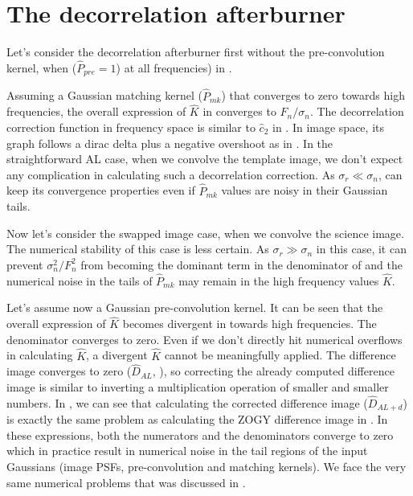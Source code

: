 \section{The decorrelation afterburner\label{sec:decorrab}}
Let's consider the decorrelation afterburner first without the
pre-convolution kernel, when (\(\hat{P}_{pre}=1\)) at all frequencies)
in .
%
\par Assuming a Gaussian matching kernel (\(\hat{P}_{mk}\)) that
converges to zero towards high frequencies, the overall expression of
\(\hat{K}\) in  converges to \(F_{n}/\sigma_n\). The
decorrelation correction function in frequency space is similar to
\(\hat{c}_2\) in . In image space, its
graph follows a dirac delta plus a negative overshoot as in
. In the straightforward AL case, when
we convolve the template image, we don't expect any complication in
calculating such a decorrelation correction. As \(\sigma_r \ll
\sigma_n\),  can keep its convergence properties even if
\(\hat{P}_{mk}\) values are noisy in their Gaussian tails.
%
\par Now let's consider the swapped image case, when we convolve the
science image.  The numerical stability of this case is less
certain. As \(\sigma_r \gg \sigma_n\) in this case, it can prevent
\(\sigma_{n}^2/F_n^2\) from becoming the dominant term in the
denominator of  and the numerical noise in the tails of
\(\hat{P}_{mk}\) may remain in the high frequency values \(\hat{K}\).
%
\par Let's assume now a Gaussian pre-convolution kernel. It can be
seen that the overall expression of \(\hat{K}\) becomes divergent in
 towards high frequencies. The denominator converges to
zero. Even if we don't directly hit numerical overflows in calculating
\(\hat{K}\), a divergent \(\hat{K}\) cannot be meaningfully
applied. The difference image converges to zero (\(\hat{D}_{AL}\),
), so correcting the already computed difference image is
similar to inverting a multiplication operation of smaller and smaller
numbers. In , we can see that calculating the
corrected difference image (\(\hat{D}_{AL+d}\)) is exactly the same
problem as calculating the ZOGY difference image in . In
these expressions, both the numerators and the denominators converge to
zero which in practice result in numerical noise in the tail regions
of the input Gaussians (image PSFs, pre-convolution and matching
kernels). We face the very same numerical problems that was discussed
in .
% 

